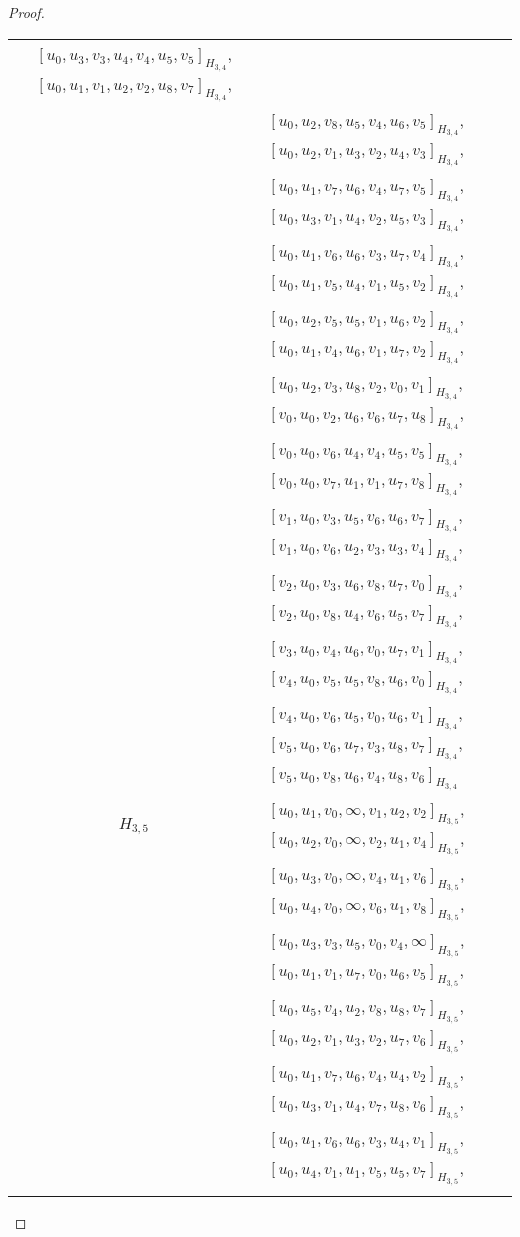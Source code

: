 \begin{subappendices}
\begin{proof}
{\begin{longtable}{|c|l|}
  $[u_0, u_3, v_3, u_4, v_4, u_5, v_5]_{H_{3,4}}$,
  $[u_0, u_1, v_1, u_2, v_2, u_8, v_7]_{H_{3,4}}$, \\* &
  $[u_0, u_2, v_8, u_5, v_4, u_6, v_5]_{H_{3,4}}$,
  $[u_0, u_2, v_1, u_3, v_2, u_4, v_3]_{H_{3,4}}$, \\* &
  $[u_0, u_1, v_7, u_6, v_4, u_7, v_5]_{H_{3,4}}$,
  $[u_0, u_3, v_1, u_4, v_2, u_5, v_3]_{H_{3,4}}$, \\* &
  $[u_0, u_1, v_6, u_6, v_3, u_7, v_4]_{H_{3,4}}$,
  $[u_0, u_1, v_5, u_4, v_1, u_5, v_2]_{H_{3,4}}$, \\* &
  $[u_0, u_2, v_5, u_5, v_1, u_6, v_2]_{H_{3,4}}$,
  $[u_0, u_1, v_4, u_6, v_1, u_7, v_2]_{H_{3,4}}$, \\* &
  $[u_0, u_2, v_3, u_8, v_2, v_0, v_1]_{H_{3,4}}$,
  $[v_0, u_0, v_2, u_6, v_6, u_7, u_8]_{H_{3,4}}$, \\* &
  $[v_0, u_0, v_6, u_4, v_4, u_5, v_5]_{H_{3,4}}$,
  $[v_0, u_0, v_7, u_1, v_1, u_7, v_8]_{H_{3,4}}$, \\* &
  $[v_1, u_0, v_3, u_5, v_6, u_6, v_7]_{H_{3,4}}$,
  $[v_1, u_0, v_6, u_2, v_3, u_3, v_4]_{H_{3,4}}$, \\* &
  $[v_2, u_0, v_3, u_6, v_8, u_7, v_0]_{H_{3,4}}$,
  $[v_2, u_0, v_8, u_4, v_6, u_5, v_7]_{H_{3,4}}$, \\* &
  $[v_3, u_0, v_4, u_6, v_0, u_7, v_1]_{H_{3,4}}$,
  $[v_4, u_0, v_5, u_5, v_8, u_6, v_0]_{H_{3,4}}$, \\* &
  $[v_4, u_0, v_6, u_5, v_0, u_6, v_1]_{H_{3,4}}$,
  $[v_5, u_0, v_6, u_7, v_3, u_8, v_7]_{H_{3,4}}$, \\* &
  $[v_5, u_0, v_8, u_6, v_4, u_8, v_6]_{H_{3,4}}$
\\ \hline
$H_{3,5}$ &
  $[u_0, u_1, v_0, \infty, v_1, u_2, v_2]_{H_{3,5}}$,
  $[u_0, u_2, v_0, \infty, v_2, u_1, v_4]_{H_{3,5}}$, \\* &
  $[u_0, u_3, v_0, \infty, v_4, u_1, v_6]_{H_{3,5}}$,
  $[u_0, u_4, v_0, \infty, v_6, u_1, v_8]_{H_{3,5}}$, \\* &
  $[u_0, u_3, v_3, u_5, v_0, v_4, \infty]_{H_{3,5}}$,
  $[u_0, u_1, v_1, u_7, v_0, u_6, v_5]_{H_{3,5}}$, \\* &
  $[u_0, u_5, v_4, u_2, v_8, u_8, v_7]_{H_{3,5}}$,
  $[u_0, u_2, v_1, u_3, v_2, u_7, v_6]_{H_{3,5}}$, \\* &
  $[u_0, u_1, v_7, u_6, v_4, u_4, v_2]_{H_{3,5}}$,
  $[u_0, u_3, v_1, u_4, v_7, u_8, v_6]_{H_{3,5}}$, \\* &
  $[u_0, u_1, v_6, u_6, v_3, u_4, v_1]_{H_{3,5}}$,
  $[u_0, u_4, v_1, u_1, v_5, u_5, v_7]_{H_{3,5}}$, \\* &

\end{longtable}}
\end{proof}
\end{subappendices}
